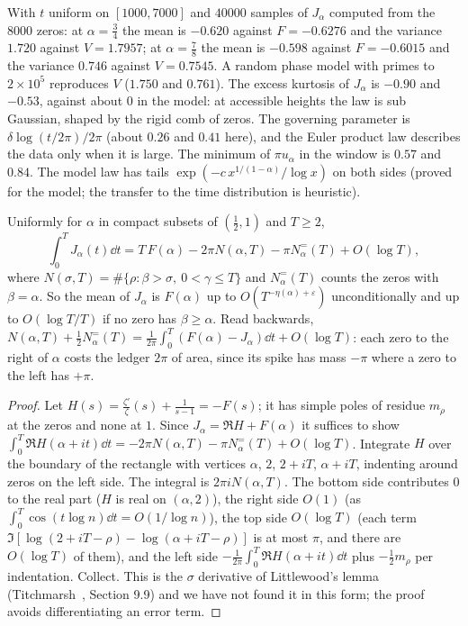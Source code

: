 \begin{remark}[Computation]\label{bo:comp:values}
With $t$ uniform on $[1000,7000]$ and $40000$ samples of $J_\alpha$ computed from the $8000$ zeros: at $\alpha=\frac34$ the mean is $-0.620$ against $F=-0.6276$ and the variance $1.720$ against $V=1.7957$; at $\alpha=\frac78$ the mean is $-0.598$ against $F=-0.6015$ and the variance $0.746$ against $V=0.7545$. A random phase model with primes to $2\times10^5$ reproduces $V$ ($1.750$ and $0.761$). The excess kurtosis of $J_\alpha$ is $-0.90$ and $-0.53$, against about $0$ in the model: at accessible heights the law is sub Gaussian, shaped by the rigid comb of zeros. The governing parameter is $\delta\log(t/2\pi)/2\pi$ (about $0.26$ and $0.41$ here), and the Euler product law describes the data only when it is large. The minimum of $\pi u_\alpha$ in the window is $0.57$ and $0.84$. The model law has tails $\exp(-c\,x^{1/(1-\alpha)}/\log x)$ on both sides (proved for the model; the transfer to the time distribution is heuristic).
\end{remark}

\begin{theorem}\label{bo:thm:meanvalue}
Uniformly for $\alpha$ in compact subsets of $(\frac12,1)$ and $T\ge2$,
\[
\int_0^TJ_\alpha(t)\dd t=T\,F(\alpha)-2\pi N(\alpha,T)-\pi N^{=}_\alpha(T)+O(\log T),
\]
where $N(\sigma,T)=\#\{\rho:\beta>\sigma,\ 0<\gamma\le T\}$ and $N^{=}_\alpha(T)$ counts the zeros with $\beta=\alpha$. So the mean of $J_\alpha$ is $F(\alpha)$ up to $O(T^{-\eta(\alpha)+\varepsilon})$ unconditionally and up to $O(\log T/T)$ if no zero has $\beta\ge\alpha$. Read backwards, $N(\alpha,T)+\frac12N^=_\alpha(T)=\frac1{2\pi}\int_0^T(F(\alpha)-J_\alpha)\dd t+O(\log T)$: each zero to the right of $\alpha$ costs the ledger $2\pi$ of area, since its spike has mass $-\pi$ where a zero to the left has $+\pi$.
\end{theorem}

\begin{proof}
Let $H(s)=\frac{\zeta'}{\zeta}(s)+\frac1{s-1}=-F(s)$; it has simple poles of residue $m_\rho$ at the zeros and none at $1$. Since $J_\alpha=\Re H+F(\alpha)$ it suffices to show $\int_0^T\Re H(\alpha+it)\dd t=-2\pi N(\alpha,T)-\pi N^=_\alpha(T)+O(\log T)$. Integrate $H$ over the boundary of the rectangle with vertices $\alpha$, $2$, $2+iT$, $\alpha+iT$, indenting around zeros on the left side. The integral is $2\pi iN(\alpha,T)$. The bottom side contributes $0$ to the real part ($H$ is real on $(\alpha,2)$), the right side $O(1)$ (as $\int_0^T\cos(t\log n)\dd t=O(1/\log n)$), the top side $O(\log T)$ (each term $\Im[\log(2+iT-\rho)-\log(\alpha+iT-\rho)]$ is at most $\pi$, and there are $O(\log T)$ of them), and the left side $-\frac1{2\pi}\int_0^T\Re H(\alpha+it)\dd t$ plus $-\frac12m_\rho$ per indentation. Collect. This is the $\sigma$ derivative of Littlewood's lemma (Titchmarsh~\cite{Titchmarsh}, Section 9.9) and we have not found it in this form; the proof avoids differentiating an error term.
\end{proof}

